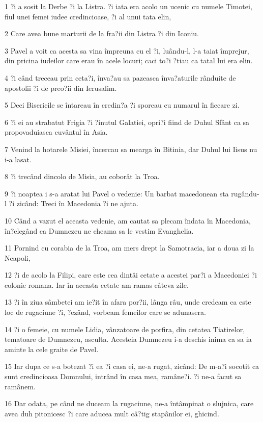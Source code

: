 \par 1 ?i a sosit la Derbe ?i la Listra. ?i iata era acolo un ucenic cu numele Timotei, fiul unei femei iudee credincioase, ?i al unui tata elin,
\par 2 Care avea bune marturii de la fra?ii din Listra ?i din Iconiu.
\par 3 Pavel a voit ca acesta sa vina împreuna cu el ?i, luându-l, l-a taiat împrejur, din pricina iudeilor care erau în acele locuri; caci to?i ?tiau ca tatal lui era elin.
\par 4 ?i când treceau prin ceta?i, înva?au sa pazeasca înva?aturile rânduite de apostolii ?i de preo?ii din Ierusalim.
\par 5 Deci Bisericile se întareau în credin?a ?i sporeau cu numarul în fiecare zi.
\par 6 ?i ei au strabatut Frigia ?i ?inutul Galatiei, opri?i fiind de Duhul Sfânt ca sa propovaduiasca cuvântul în Asia.
\par 7 Venind la hotarele Misiei, încercau sa mearga în Bitinia, dar Duhul lui Iisus nu i-a lasat.
\par 8 ?i trecând dincolo de Misia, au coborât la Troa.
\par 9 ?i noaptea i s-a aratat lui Pavel o vedenie: Un barbat macedonean sta rugându-l ?i zicând: Treci în Macedonia ?i ne ajuta.
\par 10 Când a vazut el aceasta vedenie, am cautat sa plecam îndata în Macedonia, în?elegând ca Dumnezeu ne cheama sa le vestim Evanghelia.
\par 11 Pornind cu corabia de la Troa, am mers drept la Samotracia, iar a doua zi la Neapoli,
\par 12 ?i de acolo la Filipi, care este cea dintâi cetate a acestei par?i a Macedoniei ?i colonie romana. Iar în aceasta cetate am ramas câteva zile.
\par 13 ?i în ziua sâmbetei am ie?it în afara por?ii, lânga râu, unde credeam ca este loc de rugaciune ?i, ?ezând, vorbeam femeilor care se adunasera.
\par 14 ?i o femeie, cu numele Lidia, vânzatoare de porfira, din cetatea Tiatirelor, tematoare de Dumnezeu, asculta. Acesteia Dumnezeu i-a deschis inima ca sa ia aminte la cele graite de Pavel.
\par 15 Iar dupa ce s-a botezat ?i ea ?i casa ei, ne-a rugat, zicând: De m-a?i socotit ca sunt credincioasa Domnului, intrând în casa mea, ramâne?i. ?i ne-a facut sa ramânem.
\par 16 Dar odata, pe când ne duceam la rugaciune, ne-a întâmpinat o slujnica, care avea duh pitonicesc ?i care aducea mult câ?tig stapânilor ei, ghicind.
